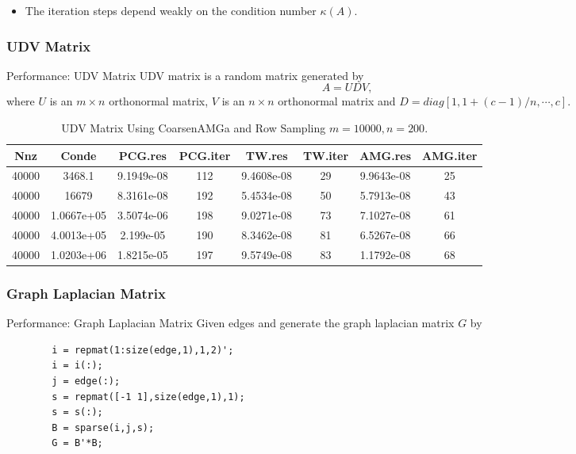 \begin{itemize}
\item The iteration steps depend weakly on the condition number $\kappa(A). $
\end{itemize}

\subsubsection{UDV Matrix}
Performance: UDV Matrix
UDV matrix is a random matrix generated by
$$
A = U D V,
$$
where $U$ is an $m \times n$ orthonormal matrix, $V$ is an $n \times n$ orthonormal matrix and
$D = diag[1,1+(c-1)/n,\cdots,c]$.

\begin{table}\label{}
\caption{UDV Matrix Using CoarsenAMGa and Row Sampling $m = 10000, n = 200.$}
\begin{tabular}{|*{8}{c|}}\hline
  Nnz    &   Conde  &      PCG.res   &   PCG.iter     & TW.res  &    TW.iter     &   AMG.res &     AMG.iter \\\hline
      40000  &      3468.1 &   9.1949e-08  &  112     &    9.4608e-08  &  29       & 9.9643e-08  &  25      \\\hline
    40000   &      16679  &  8.3161e-08 &   192     &    5.4534e-08   & 50           & 5.7913e-08    &43      \\\hline
    40000  & 1.0667e+05  &  3.5074e-06 &   198    &     9.0271e-08 &   73      &   7.1027e-08   & 61     \\\hline
    40000  &  4.0013e+05  &   2.199e-05  &  190     &    8.3462e-08  &  81       &  6.5267e-08   & 66     \\\hline
    40000   & 1.0203e+06  &  1.8215e-05  &  197    &     9.5749e-08   & 83        & 1.1792e-08  &  68    \\\hline
\end{tabular}
\end{table}



\subsubsection{Graph Laplacian Matrix}
Performance: Graph Laplacian Matrix
Given edges and generate the graph laplacian matrix $G$ by
\begin{lstlisting}
        i = repmat(1:size(edge,1),1,2)';
        i = i(:);
        j = edge(:);
        s = repmat([-1 1],size(edge,1),1);
        s = s(:);
        B = sparse(i,j,s);
        G = B'*B;
\end{lstlisting}


